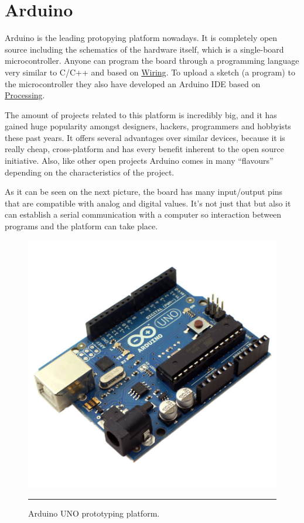 
\section{Arduino}

Arduino is the leading protopying platform nowadays. It is completely open source including the schematics of the hardware itself, which is a single-board microcontroller. Anyone can program the board through a programming language very similar to C/C++ and based on \href{http://wiring.org.co}{Wiring}. To upload a sketch (a program) to the microcontroller they also have developed an Arduino IDE based on \href{htpp://processing.org}{Processing}.

The amount of projects related to this platform is incredibly big, and it has gained huge popularity amongst designers, hackers, programmers and hobbyists these past years. It offers several advantages over similar devices, because it is really cheap, cross-platform and has every benefit inherent to the open source initiative. Also, like other open projects Arduino comes in many ``flavours'' depending on the characteristics of the project.

As it can be seen on the next picture, the board has many input/output pins that are compatible with analog and digital values. It's not just that but also it can establish a serial communication with a computer so interaction between programs and the platform can take place.


\begin{figure}[htbp]
    \centering
    \includegraphics[scale=0.2]{./Figures/auno.jpg}
        \rule{35em}{0.5pt}
        \caption[Arduino UNO]{Arduino UNO prototyping platform.}
    \label{fig:ArduinoUNO}
\end{figure}


